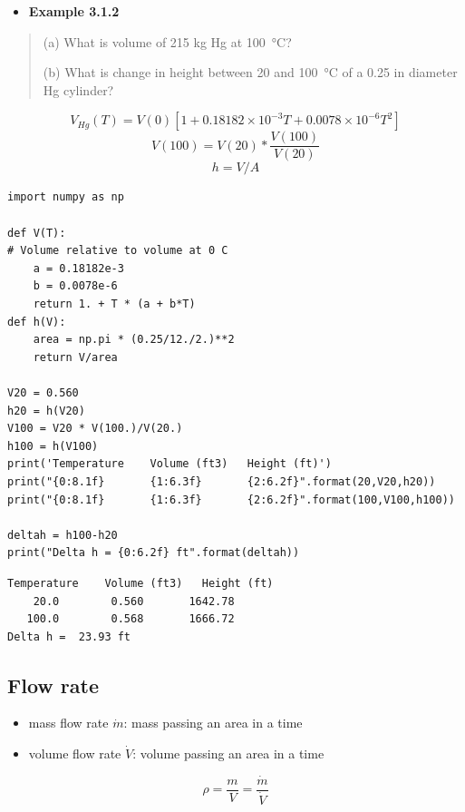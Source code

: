 \documentclass[11pt]{article}
\begin{document}
\hline
\begin{itemize}
\item \textbf{Example 3.1.2}
\end{itemize}

\begin{quote}
(a) What is volume of 215 kg Hg at \SI{100}{\celsius}?

(b) What is change in height between 20 and \SI{100}{\celsius} of a 0.25 in diameter Hg cylinder?
\end{quote}
\[ V_{Hg}(T) = V(0) [ 1 + 0.18182\times 10^{-3} T + 0.0078\times 10^{-6} T^{2} ] \]
\[ V(100) = V(20) * \frac{V(100)}{V(20)} \]
\[h = V/A\]

\begin{verbatim}
import numpy as np

def V(T):
# Volume relative to volume at 0 C
    a = 0.18182e-3
    b = 0.0078e-6
    return 1. + T * (a + b*T)
def h(V):
    area = np.pi * (0.25/12./2.)**2
    return V/area

V20 = 0.560
h20 = h(V20)
V100 = V20 * V(100.)/V(20.)
h100 = h(V100)
print('Temperature    Volume (ft3)   Height (ft)')
print("{0:8.1f}       {1:6.3f}       {2:6.2f}".format(20,V20,h20))
print("{0:8.1f}       {1:6.3f}       {2:6.2f}".format(100,V100,h100))

deltah = h100-h20
print("Delta h = {0:6.2f} ft".format(deltah))
\end{verbatim}

\begin{verbatim}
Temperature    Volume (ft3)   Height (ft)
    20.0        0.560       1642.78
   100.0        0.568       1666.72
Delta h =  23.93 ft
\end{verbatim}

\hline
\subsection{Flow rate}
\label{sec-4-3}
\begin{itemize}
\item mass flow rate \(\dot{m}\): mass passing an area in a time
\item volume flow rate \(\dot{V}\): volume passing an area in a time
\end{itemize}

\[\rho =\frac{m}{V}=\frac{\dot{m}}{\dot{V}} \]
\end{document}
